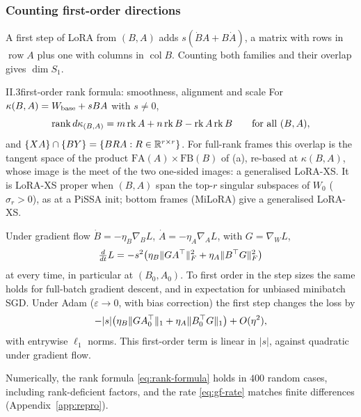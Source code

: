 \subsubsection{Counting first-order directions}\label{sec:strata-count}

A first step of LoRA from $(B,A)$ adds $s(\dot BA+B\dot A)$, a matrix with rows in $\operatorname{row}A$ plus one with
columns in $\operatorname{col}B$. Counting both families and their overlap gives $\dim S_1$.

\begin{proposition}{II.3}{first-order rank formula: smoothness, alignment and scale}
For $\kappa(B,A)=W_{\rm base}+sBA$ with $s\ne0$,
\begin{equation}\label{eq:rank-formula}
  \rk d\kappa_{(B,A)}=m\operatorname{rk}A+n\operatorname{rk}B-\operatorname{rk}A\operatorname{rk}B\qquad\text{for all }(B,A),
\end{equation}
and $\{XA\}\cap\{BY\}=\{BRA:R\in\R^{r\times r}\}$. For full-rank frames this overlap is the tangent space of the
product $\mathrm{FA}(A)\times\mathrm{FB}(B)$ of (a), re-based at $\kappa(B,A)$, whose image is
the meet of the two one-sided images: a generalised LoRA-XS. It is LoRA-XS proper when $(B,A)$ span the top-$r$
singular subspaces of $W_0$ ($\sigma_r>0$), as at a PiSSA init; bottom frames (MiLoRA) give a generalised LoRA-XS.

Under gradient flow $\dot B=-\eta_B\nabla_BL$, $\dot A=-\eta_A\nabla_AL$, with $G=\nabla_WL$,
\begin{equation}\label{eq:gf-rate}
  \tfrac{d}{dt}L=-s^2\big(\eta_B\|GA\T\|_F^2+\eta_A\|B\T G\|_F^2\big)
\end{equation}
at every time, in particular at $(B_0,A_0)$. To first order in the step sizes the same holds for full-batch gradient
descent, and in expectation for unbiased minibatch SGD. Under Adam ($\varepsilon\to0$, with bias correction) the first
step changes the loss by
\begin{equation}\label{eq:adam-rate}
  -\lvert s\rvert\big(\eta_B\|GA_0\T\|_1+\eta_A\|B_0\T G\|_1\big)+O(\eta^2),
\end{equation}
with entrywise $\ell_1$ norms. This first-order term is linear in $\lvert s\rvert$, against quadratic under gradient
flow.
\end{proposition}

Numerically, the rank formula \eqref{eq:rank-formula} holds in $400$ random cases, including rank-deficient factors,
and the rate \eqref{eq:gf-rate} matches finite differences (Appendix~\ref{app:repro}).

